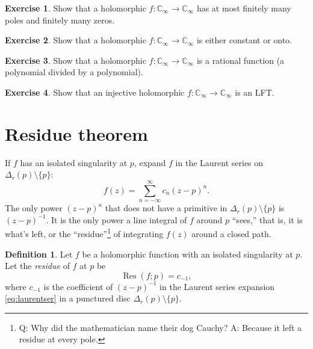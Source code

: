 \documentclass[12pt,openany]{book}
\newcommand{\C}{{\mathbb{C}}}
\newcommand{\myindex}[1]{#1\index{#1}}
\newcommand{\myquote}[1]{``#1''}
\theoremstyle{plain}
\theoremstyle{remark}
\theoremstyle{definition}
\newtheorem{defn}[thm]{Definition}
\newenvironment{exbox}{%
    \def\FrameCommand{\vrule width 1pt \relax\hspace{10pt}}%
    \MakeFramed{\advance\hsize-\width\FrameRestore}%
}{%
    \endMakeFramed
}
\theoremstyle{exercise}
\newtheorem{exercise}{Exercise}[section]
\theoremstyle{example}
\begin{document}
\begin{exbox}
\begin{exercise}
Show that a holomorphic $f \colon \C_\infty \to \C_\infty$ has
at most finitely many poles and finitely many zeros.
\end{exercise}

\begin{exercise}
Show that a holomorphic $f \colon \C_\infty \to \C_\infty$ is
either constant or onto.
\end{exercise}

\begin{exercise}
Show that a holomorphic $f \colon \C_\infty \to \C_\infty$ is a
rational function (a polynomial divided by a polynomial).
\end{exercise}

\begin{exercise}
Show that an injective holomorphic $f \colon \C_\infty \to \C_\infty$ is an
LFT\@.
\end{exercise}
\end{exbox}


\section{Residue theorem}

If $f$ has an isolated singularity at $p$,
expand
$f$ in the Laurent series on $\Delta_r(p) \setminus \{ p \}$:
\begin{equation} \label{eq:laurentser}
f(z) = \sum_{n=-\infty}^\infty c_n {(z-p)}^n .
\end{equation}
The only power ${(z-p)}^n$ that does not have a primitive in
$\Delta_r(p) \setminus \{ p \}$ is ${(z-p)}^{-1}$.  It is the only power
a line integral of $f$ around $p$ \myquote{sees,} that is, it is
what's left, or the \myquote{residue}\footnote{%
Q\@: Why did the mathematician name their dog Cauchy?
A\@: Because it left a residue at every pole.}
of integrating $f(z)$ around a closed path.

\begin{defn}
Let $f$ be a holomorphic function
with an isolated singularity at $p$.
Let the \emph{\myindex{residue}} of $f$ at $p$ be
%
\begin{equation*}
\operatorname{Res}(f;p) = c_{-1} ,
\end{equation*}
where $c_{-1}$ is the coefficient of ${(z-p)}^{-1}$ in the Laurent series
expansion \eqref{eq:laurentser} in a punctured disc $\Delta_r(p) \setminus \{ p \}$.
\end{defn}
\end{document}

